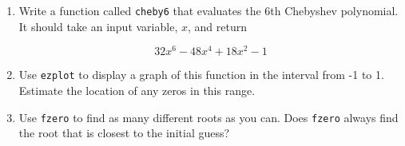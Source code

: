\begin{ex}

\begin{enumerate}


\item Write a function called {\tt cheby6} that evaluates the
6th Chebyshev polynomial.  It should take an input variable,
$x$, and return

\begin{equation}
32 x^6 - 48 x^4 + 18 x^2 - 1
\end{equation}

\item Use {\tt ezplot} to display a graph of this function in the
interval from -1 to 1.  Estimate the location of any zeros in this
range.

\item Use {\tt fzero} to find as many different roots as you can.
Does {\tt fzero} always find the root that is closest to the initial
guess?

\end{enumerate}

\end{ex}


